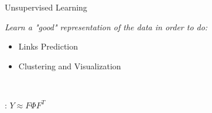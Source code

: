 \begin{frame}[t]{Unsupervised Learning}

    \textit{\Large{Learn a  \emph{"good"} representation of the data in order to do: }}
    \begin{itemize}
        \item Links Prediction
        \item Clustering and Visualization
    \end{itemize}


    \pause ~\\

    \begin{description}[align]
        \item[Approximate the adjacency matrix]:  $Y \approx F\Phi F^T$
    \end{description}


\end{frame}
